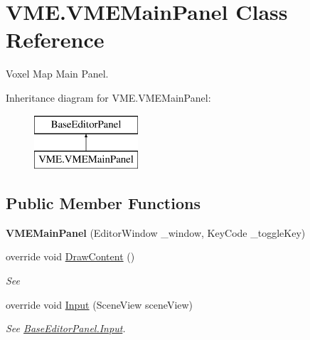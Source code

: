 \hypertarget{class_v_m_e_1_1_v_m_e_main_panel}{}\section{V\+M\+E.\+V\+M\+E\+Main\+Panel Class Reference}
\label{class_v_m_e_1_1_v_m_e_main_panel}


Voxel Map Main Panel.  


Inheritance diagram for V\+M\+E.\+V\+M\+E\+Main\+Panel\+:\begin{figure}[H]
\begin{center}
\leavevmode
\includegraphics[height=2.000000cm]{class_v_m_e_1_1_v_m_e_main_panel}
\end{center}
\end{figure}
\subsection*{Public Member Functions}
\begin{DoxyCompactItemize}
\item 
{\bfseries V\+M\+E\+Main\+Panel} (Editor\+Window \+\_\+window, Key\+Code \+\_\+toggle\+Key)\hypertarget{class_v_m_e_1_1_v_m_e_main_panel_ab8d64c9d0dc0cdc5763d50cd9c4a40a8}{}\label{class_v_m_e_1_1_v_m_e_main_panel_ab8d64c9d0dc0cdc5763d50cd9c4a40a8}

\item 
override void \hyperlink{class_v_m_e_1_1_v_m_e_main_panel_a31c00f8725239c4e1758f32bb0d29cf9}{Draw\+Content} ()
\begin{DoxyCompactList}\small\item\em See \end{DoxyCompactList}\item 
override void \hyperlink{class_v_m_e_1_1_v_m_e_main_panel_a3ee8bf67ac932165d48986d3dbba1fb4}{Input} (Scene\+View scene\+View)
\begin{DoxyCompactList}\small\item\em See \hyperlink{class_base_editor_panel_a9bd01437be0e246418dc89209ef2125b}{Base\+Editor\+Panel.\+Input}. \end{DoxyCompactList}\end{DoxyCompactItemize}
